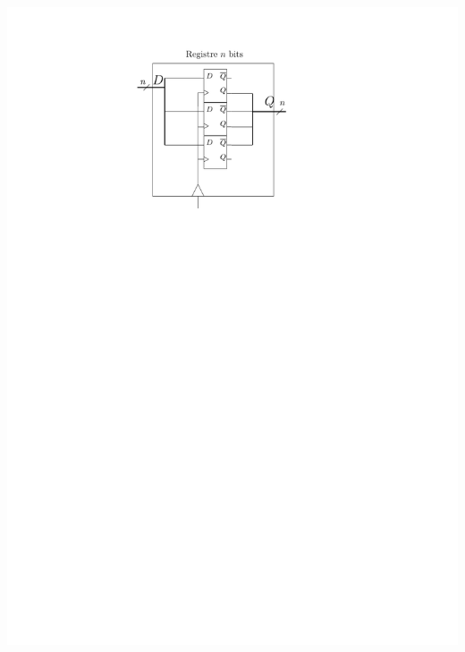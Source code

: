 \documentclass{beamer}
\begin{document}
\begin{frame}
\begin{minipage}[c]{.4\linewidth}
\includegraphics[width=\columnwidth]{Figs/registre_inner.pdf}
\end{minipage}

\end{frame}
\end{document}
